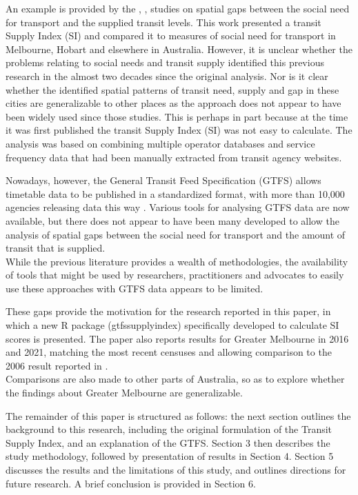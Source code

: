\documentclass[preprint, 3p,
authoryear]{elsarticle} %
\begin{document}
An example is provided by the \citet{Currie2003Hobart}
\citet{Currie2004Gap}, \citet{Currie2007Identifying},
\citet{currie2010identifying} studies on spatial gaps between the social
need for transport and the supplied transit levels. This work presented
a transit Supply Index (SI) and compared it to measures of social need
for transport in Melbourne, Hobart and elsewhere in Australia. However,
it is unclear whether the problems relating to social needs and transit
supply identified this previous research in the almost two decades since
the original analysis. Nor is it clear whether the identified spatial
patterns of transit need, supply and gap in these cities are
generalizable to other places as the \citet{currie2010identifying}
approach does not appear to have been widely used since those studies.
This is perhaps in part because at the time it was first published the
transit Supply Index (SI) was not easy to calculate. The
\citet{currie2010identifying} analysis was based on combining multiple
operator databases and service frequency data that had been manually
extracted from transit agency websites.

Nowadays, however, the General Transit Feed Specification (GTFS) allows
timetable data to be published in a standardized format, with more than
10,000 agencies releasing data this way \citep{GTFS}. Various tools for
analysing GTFS data are now available, but there does not appear to have
been many developed to allow the analysis of spatial gaps between the
social need for transport and the amount of transit that is supplied.\\
While the previous literature provides a wealth of methodologies, the
availability of tools that might be used by researchers, practitioners
and advocates to easily use these approaches with GTFS data appears to
be limited.

These gaps provide the motivation for the research reported in this
paper, in which a new R package (gtfssupplyindex) specifically developed
to calculate SI scores is presented. The paper also reports results for
Greater Melbourne in 2016 and 2021, matching the most recent censuses
and allowing comparison to the 2006 result reported in
\citet{currie2010identifying}.\\
Comparisons are also made to other parts of Australia, so as to explore
whether the findings about Greater Melbourne are generalizable.

The remainder of this paper is structured as follows: the next section
outlines the background to this research, including the original
formulation of the Transit Supply Index, and an explanation of the GTFS.
Section 3 then describes the study methodology, followed by presentation
of results in Section 4. Section 5 discusses the results and the
limitations of this study, and outlines directions for future research.
A brief conclusion is provided in Section 6.
\end{document}
